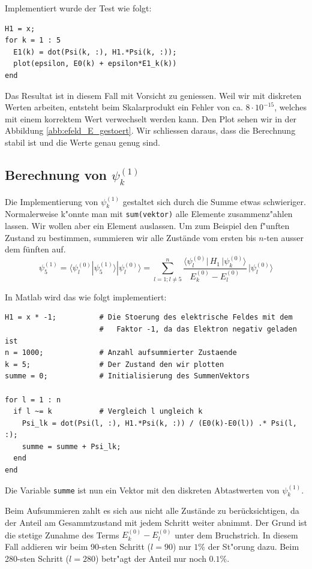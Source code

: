 \begin{refsection}
Implementiert wurde der Test wie folgt:
\begin{lstlisting}[style=Matlab]
H1 = x;
for k = 1 : 5
  E1(k) = dot(Psi(k, :), H1.*Psi(k, :));
  plot(epsilon, E0(k) + epsilon*E1_k(k))
end
\end{lstlisting}
Das Resultat ist in diesem Fall mit Vorsicht zu geniessen.
Weil wir mit diskreten Werten arbeiten, entsteht beim Skalarprodukt ein Fehler von ca. $8 \cdot 10^{-15}$,
welches mit einem korrektem Wert verwechselt werden kann.
Den Plot sehen wir in der Abbildung \ref{abb:efeld_E_gestoert}.
Wir schliessen daraus, dass die Berechnung stabil ist und die Werte genau genug sind.





\subsection{Berechnung von $\psi_k^{(1)}$}

Die Implementierung von $\psi_k^{(1)}$ gestaltet sich durch die Summe etwas schwieriger.
Normalerweise k"onnte man mit \verb|sum(vektor)| alle Elemente zusammenz"ahlen lassen.
Wir wollen aber ein Element auslassen. 
Um zum Beispiel den f"unften Zustand zu bestimmen, summieren wir alle Zust\"ande vom 
ersten bis $n$-ten ausser dem f\"unften auf.
\begin{equation}
  \psi_5^{(1)} = \langle\psi_l^{(0)}|\psi_5^{(1)}\rangle|\psi_l^{(0)}\rangle = 
  \sum_{l=1 ; l\ne 5}^{n}
    \frac{\langle \psi_l^{(0)}|\, H_1 \,|\psi_k^{(0)}\rangle}{E_k^{(0)}-E_l^{(0)}}
        \,
    |\psi_l^{(0)}\rangle
\end{equation}

In Matlab wird das wie folgt implementiert:
\begin{lstlisting}[style=Matlab]
H1 = x * -1;          # Die Stoerung des elektrische Feldes mit dem
                      #   Faktor -1, da das Elektron negativ geladen ist
n = 1000;             # Anzahl aufsummierter Zustaende
k = 5;                # Der Zustand den wir plotten
summe = 0;            # Initialisierung des SummenVektors

for l = 1 : n
  if l ~= k           # Vergleich l ungleich k
    Psi_lk = dot(Psi(l, :), H1.*Psi(k, :)) / (E0(k)-E0(l)) .* Psi(l, :);
    summe = summe + Psi_lk;
  end
end
\end{lstlisting}
Die Variable \verb|summe| ist nun ein Vektor mit den diskreten Abtastwerten von $\psi_k^{(1)}$.

Beim Aufsummieren zahlt es sich aus nicht alle Zust\"ande zu ber\"ucksichtigen, da der Anteil am Gesammtzustand 
mit jedem Schritt weiter abnimmt. Der Grund ist die stetige Zunahme des Terms 
$E^{(0)}_k-E^{(0)}_l$ unter dem Bruchstrich.
In diesem Fall addieren wir beim 90-sten Schritt ($l=90$) nur $1\%$ der St"orung dazu.
Beim 280-sten Schritt ($l=280$) betr"agt der Anteil nur noch $0.1\%$.


\end{refsection}
